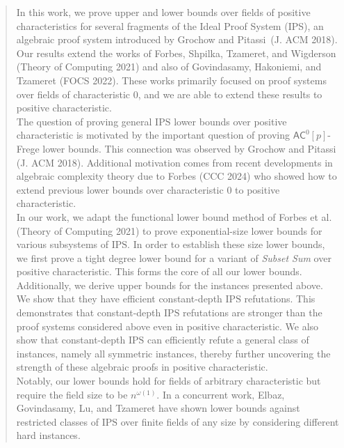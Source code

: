 \documentclass[11pt]{article}
\begin{document}
\begin{abstract}
In this work, we prove upper and lower bounds over fields of positive characteristics for several fragments of the Ideal Proof System (IPS), an algebraic proof system introduced by Grochow and Pitassi~(J. ACM 2018). Our results extend the works of Forbes, Shpilka, Tzameret, and Wigderson (Theory of Computing 2021) and also of Govindasamy, Hakoniemi, and Tzameret (FOCS 2022). These works primarily focused on proof systems over fields of characteristic 0, and we are able to extend these results to positive characteristic.\\ 

The question of proving general $\mathrm{IPS}$ lower bounds over positive characteristic is motivated by the important question of proving $\mathsf{AC}^{0}[p]$-Frege lower bounds. This connection was observed by Grochow and Pitassi (J. ACM 2018). Additional motivation comes from recent developments in algebraic complexity theory due to Forbes (CCC 2024)  who showed how to extend previous lower bounds over characteristic $0$ to positive characteristic.\\ 

In our work, we adapt the functional lower bound method of Forbes et al. (Theory of Computing 2021) to prove exponential-size lower bounds for various subsystems of $\mathrm{IPS}$. In order to establish these size lower bounds, we first prove a tight degree lower bound for a variant of \emph{Subset Sum} over positive characteristic. This forms the core of all our lower bounds.\\ 

Additionally, we derive upper bounds for the instances presented above. We show that they have efficient constant-depth $\mathrm{IPS}$ refutations. This demonstrates that constant-depth $\mathrm{IPS}$ refutations are stronger than the proof systems considered above even in positive characteristic. We also show that constant-depth $\mathrm{IPS}$ can efficiently refute a general class of instances, namely all symmetric instances, thereby further uncovering the strength of these algebraic proofs in positive characteristic.\\ 

Notably, our lower bounds hold for fields of arbitrary characteristic but require the field size to be $n^{\omega(1)}$. In a concurrent work, Elbaz, Govindasamy, Lu, and Tzameret have shown lower bounds against restricted classes of $\mathrm{IPS}$ over finite fields of any size by considering different hard instances.
\end{abstract}
\end{document}
